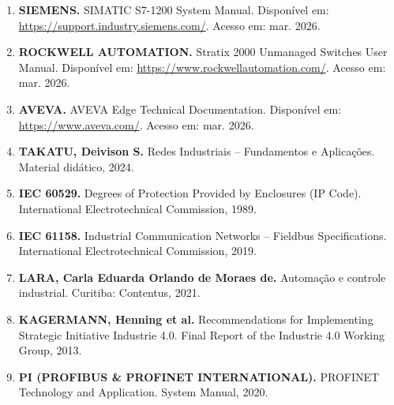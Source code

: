 \documentclass[12pt,a4paper]{article}
\begin{document}
\begin{enumerate}
    \item \textbf{SIEMENS.} SIMATIC S7-1200 System Manual. Disponível em: \url{https://support.industry.siemens.com/}. Acesso em: mar. 2026.

    \item \textbf{ROCKWELL AUTOMATION.} Stratix 2000 Unmanaged Switches User Manual. Disponível em: \url{https://www.rockwellautomation.com/}. Acesso em: mar. 2026.

    \item \textbf{AVEVA.} AVEVA Edge Technical Documentation. Disponível em: \url{https://www.aveva.com/}. Acesso em: mar. 2026.

    \item \textbf{TAKATU, Deivison S.} Redes Industriais -- Fundamentos e Aplicações. Material didático, 2024.

    \item \textbf{IEC 60529.} Degrees of Protection Provided by Enclosures (IP Code). International Electrotechnical Commission, 1989.

    \item \textbf{IEC 61158.} Industrial Communication Networks -- Fieldbus Specifications. International Electrotechnical Commission, 2019.

    \item \textbf{LARA, Carla Eduarda Orlando de Moraes de.} Automação e controle industrial. Curitiba: Contentus, 2021.

    \item \textbf{KAGERMANN, Henning et al.} Recommendations for Implementing Strategic Initiative Industrie 4.0. Final Report of the Industrie 4.0 Working Group, 2013.

    \item \textbf{PI (PROFIBUS \& PROFINET INTERNATIONAL).} PROFINET Technology and Application. System Manual, 2020.
\end{enumerate}
\end{document}
